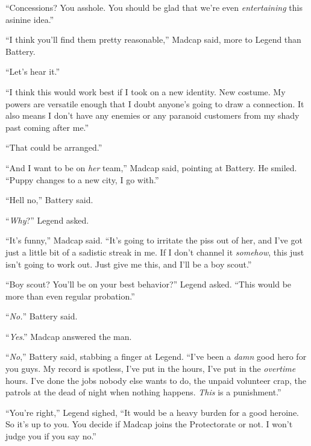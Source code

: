``Concessions?  You asshole.  You should be glad that we're even \emph{entertaining }this asinine idea.''



``I think you'll find them pretty reasonable,'' Madcap said, more to Legend than Battery.



``Let's hear it.''



``I think this would work best if I took on a new identity.  New costume.  My powers are versatile enough that I doubt anyone's going to draw a connection.  It also means I don't have any enemies or any paranoid customers from my shady past coming after me.''



``That could be arranged.''



``And I want to be on \emph{her} team,'' Madcap said, pointing at Battery.  He smiled.  ``Puppy changes to a new city, I go with.''



``Hell no,'' Battery said.



``\emph{Why}?'' Legend asked.



``It's funny,'' Madcap said.  ``It's going to irritate the piss out of her, and I've got just a little bit of a sadistic streak in me.  If I don't channel it \emph{somehow}, this just isn't going to work out.  Just give me this, and I'll be a boy scout.''



``Boy scout?  You'll be on your best behavior?''  Legend asked.  ``This would be more than even regular probation.''



``\emph{No.}'' Battery said.



``\emph{Yes}.''  Madcap answered the man.



``\emph{No},'' Battery said, stabbing a finger at Legend.  ``I've been a \emph{damn} good hero for you guys.  My record is spotless, I've put in the hours, I've put in the \emph{overtime} hours.  I've done the jobs nobody else wants to do, the unpaid volunteer crap, the patrols at the dead of night when nothing happens.  \emph{This} is a punishment.''



``You're right,'' Legend sighed, ``It would be a heavy burden for a good heroine.  So it's up to you.  You decide if Madcap joins the Protectorate or not.  I won't judge you if you say no.''



